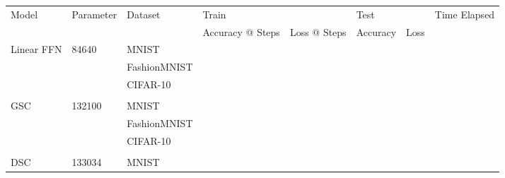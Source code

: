 \usepackage{}\documentclass{article}
\begin{document}
\begin{table}[]
\centering
\begin{tabular}{@{}llllllll@{}}
\toprule
\multirow{2}{*}{Model}      & \multirow{2}{*}{Parameter} & \multirow{2}{*}{Dataset} & \multicolumn{2}{l}{Train}       & \multicolumn{2}{l}{Test} & \multirow{2}{*}{Time Elapsed} \\ \cmidrule(lr){4-7}
                            &                            &                          & Accuracy @ Steps & Loss @ Steps & Accuracy      & Loss     &                               \\ \cmidrule(r){1-3} \cmidrule(l){8-8} 
\multirow{3}{*}{Linear FFN} & \multirow{3}{*}{84640}     & MNIST                    &                  &              &               &          &                               \\
                            &                            & FashionMNIST             &                  &              &               &          &                               \\
                            &                            & CIFAR-10                 &                  &              &               &          &                               \\
                            &                            &                          &                  &              &               &          &                               \\
GSC                         & 132100                     & MNIST                    &                  &              &               &          &                               \\
                            &                            & FashionMNIST             &                  &              &               &          &                               \\
                            &                            & CIFAR-10                 &                  &              &               &          &                               \\
                            &                            &                          &                  &              &               &          &                               \\
DSC                         & 133034                     & MNIST                    &                  &              &               &          &                               \\

\end{tabular}
\end{table}
\end{document}
